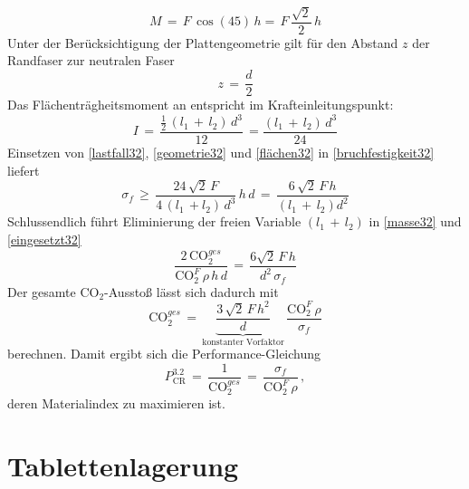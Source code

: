 \begin{equation}\label{lastfall32}
M\,=\,F\,\cos(45)\,h=\,F\,\frac{\sqrt{2}}{2}\,h
\end{equation}
Unter der Berücksichtigung der Plattengeometrie gilt für den Abstand $z$ der Randfaser zur neutralen Faser
\begin{equation}\label{geometrie32}
z\,=\,\frac{d}{2}
\end{equation}
Das Flächenträgheitsmoment an entspricht im Krafteinleitungspunkt:
\begin{equation}\label{flächen32}
I\,=\,\frac{\frac{1}{2}\,(l_1\,+\,l_2)\,d^3}{12}\,=\frac{(l_1\,+\,l_2)\,d^3}{24}
\end{equation}
Einsetzen von \ref{lastfall32}, \ref{geometrie32} und \ref{flächen32} in \ref{bruchfestigkeit32} liefert
\begin{equation}\label{eingesetzt32}
\sigma_f\,\ge\,\frac{24\,\sqrt{2}\,F}{4\,(l_1\,+l_2)\,d^3}\,h\,d\,=\,\frac{6\,\sqrt{2}\,F\,h}{(l_1\,+\,l_2)d^2}
\end{equation}
Schlussendlich führt Eliminierung der freien Variable $(l_1\,+\,l_2)$ in \ref{masse32} und \ref{eingesetzt32}
\begin{equation}
\frac{2\,\text{CO}_2^{ges}}{\text{CO}_2^F\,\rho\,h\,d}\,=\,\frac{6\sqrt{2}\,F\,h}{d^2\,\sigma_f}
\end{equation}
Der gesamte CO$_2$-Ausstoß lässt sich dadurch mit
\begin{equation}
\text{CO}_2^{ges}\,=\,\underbrace{\frac{3\,\sqrt{2}\,F\,h^2}{d}}_{\text{konstanter Vorfaktor}}\,\frac{\text{CO}_2^F\,\rho}{\sigma_f}
\end{equation}
berechnen.
Damit ergibt sich die Performance-Gleichung
\begin{equation} \label{zielfkt32}
P_{\text{CR}}^{3.2}\,=\,\frac{1}{\text{CO}_2^{ges}}\,=\,\frac{\sigma_f}{\text{CO}_2^F\,\rho}\,,
\end{equation}
deren Materialindex zu maximieren ist.

\section{Tablettenlagerung}

